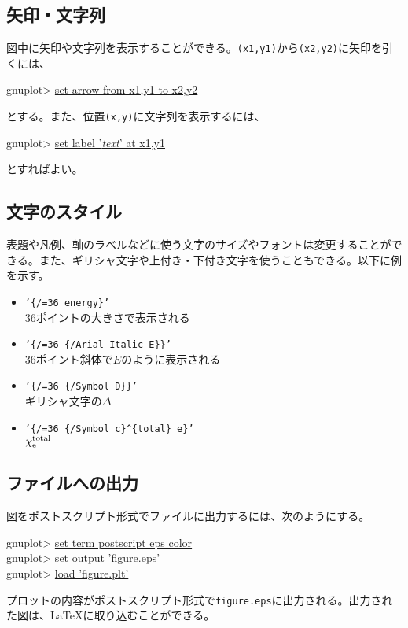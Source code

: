 {\subsection{矢印・文字列}

図中に矢印や文字列を表示することができる。{\tt (x1,y1)}から{\tt (x2,y2)}に矢印を引くには、
\begin{commandline2}
gnuplot> \underline{set arrow from x1,y1 to x2,y2}
\end{commandline2} \noindent
とする。また、位置{\tt (x,y)}に文字列を表示するには、
\begin{commandline2}
gnuplot> \underline{set label '{\it text}' at x1,y1}
\end{commandline2} \noindent
とすればよい。

\subsection{文字のスタイル}

表題や凡例、軸のラベルなどに使う文字のサイズやフォントは変更することができる。また、ギリシャ文字や上付き・下付き文字を使うこともできる。以下に例を示す。
\begin{itemize}
\item {\tt '\{/=36 energy\}'} \\
  36ポイントの大きさで表示される
\item {\tt '\{/=36 \{/Arial-Italic E\}\}'} \\
  36ポイント斜体で$E$のように表示される
\item {\tt '\{/=36 \{/Symbol D\}\}'} \\
  ギリシャ文字の$\Delta$
\item {\tt '\{/=36 \{/Symbol c\}\^{}\{total\}\_e\}'} \\
  $\chi^{\rm total}_{\rm e}$
\end{itemize}

\subsection{ファイルへの出力}

図をポストスクリプト形式でファイルに出力するには、次のようにする。
\begin{commandline2}
gnuplot> \underline{set term postscript eps color} \\
gnuplot> \underline{set output 'figure.eps'} \\
gnuplot> \underline{load 'figure.plt'}
\end{commandline2} \noindent
プロットの内容がポストスクリプト形式で{\tt figure.eps}に出力される。出力された図は、\LaTeX に取り込むことができる。

}
